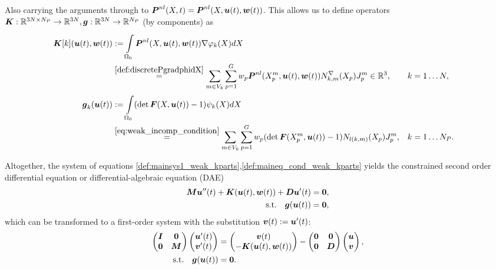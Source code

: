 Also carrying the arguments through to $\vPnl(X,t) = \vPnl(X,\vu(t),\vw(t))$.
This allows us to define operators $\vK: \R^{3N\times N_P}\to\R^{3N}, \vg:\R^{3N}\to\R^{N_P}$ (by components) as
\begin{align}
	\vK[k](\vu(t),\vw(t)) &:= \intor\vPnl(X,\vu(t),\vw(t))\dpk dX\\
	&\re{def:discretePgradphidX} \sumvk\sumgp w_p\vPnl(\pmp,\vu(t),\vw(t))\dNkmp\jmp\in\R^3, && k=1\ldots N,\\
	\vg_k(\vu(t)) &:= \intor (\det\vF(X,\vu(t))-1)\psi_k(X)dX\\
	&\re{eq:weak_incomp_condition}\sumvk\sumgp w_p (\det\vF(\pmp,\vu(t))-1) \Nkmp\jmp, && k=1\ldots N_P.
\end{align}

Altogether, the system of equations \eqref{def:mainsys1_weak_kparts},\eqref{def:maineq_cond_weak_kparts} yields the constrained second order differential equation
or differential-algebraic equation (DAE)
\begin{align}
	\vM\vu''(t) + \vK(\vu(t),\vw(t)) + \vD\vu'(t) &= \vnull,\\
		\text{s.t.}\quad \vg(\vu(t)) &= \vnull,
\end{align}
which can be transformed to a first-order system with the substitution $\vv(t) := \vu'(t)$:
\begin{align}
	\m{\vI & \vnull\\ \vnull & \vM}\m{\vu'(t)\\ \vv'(t)} 
	&= \m{\vv(t) \\ -\vK(\vu(t),\vw(t))} - \m{\vnull &\vnull\\ \vnull &\vD \\}\m{\vu \\ \vv},\\
	\text{s.t.}\quad \vg(\vu(t))		&= \vnull.
\end{align}

